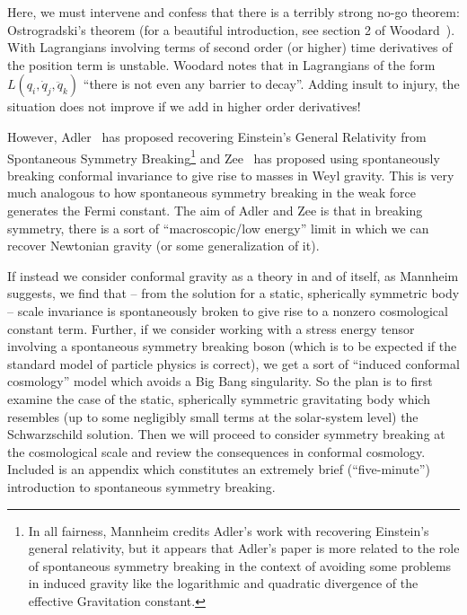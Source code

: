 Here, we must intervene and confess that there is a terribly strong
no-go theorem: Ostrogradski's theorem (for a beautiful introduction,
see section 2 of Woodard~\cite{Woodard:2006nt}). With
Lagrangians involving terms of second order (or higher) time
derivatives of the position term is unstable. Woodard notes that in
Lagrangians of the form $L(q_{i},\dot{q}_{j},\ddot{q}_{k})$ ``there is
not even any barrier to decay''. Adding insult to injury, the
situation does not improve if we add in higher order derivatives!

However, Adler~\cite{adler1982} has proposed recovering
Einstein's General Relativity from Spontaneous Symmetry
Breaking\footnote{In all fairness, Mannheim credits Adler's work
  with recovering Einstein's general relativity, but it appears
  that Adler's paper is more related to the role of spontaneous
  symmetry breaking in the context of avoiding some problems in
  induced gravity like the logarithmic and quadratic divergence
  of the effective Gravitation constant.}
and Zee~\cite{1983AnPhy.151..431Z} has proposed using
spontaneously breaking conformal invariance to give rise to
masses in Weyl gravity. This is very much analogous to how
spontaneous symmetry breaking in the weak force generates the
Fermi constant. The aim of Adler and Zee is that in breaking
symmetry, there is a sort of ``macroscopic/low energy'' limit in
which we can recover Newtonian gravity (or some generalization of
it). 

If instead we consider conformal gravity as a theory in and of
itself, as Mannheim suggests, we find that -- from the solution for
a static, spherically symmetric body -- scale invariance is
spontaneously broken to give rise to a nonzero cosmological
constant term. Further, if we consider working with a stress
energy tensor involving a spontaneous symmetry breaking boson
(which is to be expected if the standard model of particle
physics is correct), we get a sort of ``induced conformal
cosmology'' model which avoids a Big Bang singularity. So the plan is
to first examine the case of the static, spherically symmetric
gravitating body which resembles (up to some negligibly small terms at
the solar-system level) the Schwarzschild solution. Then we will
proceed to consider symmetry breaking at the cosmological
scale and review the consequences in conformal cosmology. Included is
an appendix which constitutes an extremely brief (``five-minute'')
introduction to spontaneous symmetry breaking. 

